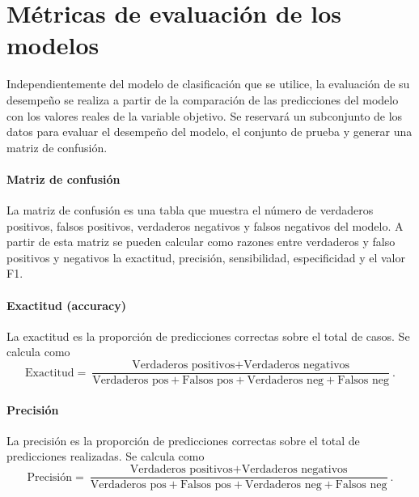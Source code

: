 \documentclass[a4paper]{report}
\begin{document}



\section{Métricas de evaluación de los modelos}

Independientemente del modelo de clasificación que se utilice, la evaluación de su desempeño se realiza a partir de la comparación de las predicciones del modelo con los valores reales de la variable objetivo.
Se reservará un subconjunto de los datos para evaluar el desempeño del modelo, el conjunto de prueba y generar una matriz de confusión.

\paragraph{Matriz de confusión}
La matriz de confusión es una tabla que muestra el número de verdaderos positivos, falsos positivos, verdaderos negativos y falsos negativos del modelo.
A partir de esta matriz se pueden calcular como razones entre verdaderos y falso positivos y negativos la exactitud, precisión, sensibilidad, especificidad y el valor F1.

\paragraph{Exactitud (accuracy)}
La exactitud es la proporción de predicciones correctas sobre el total de casos.
Se calcula como
\begin{equation}
	\text{Exactitud} = \frac{\text{Verdaderos positivos} + \text{Verdaderos negativos}}{\text{Verdaderos pos} + \text{Falsos pos} + \text{Verdaderos neg} + \text{Falsos neg}}.
\end{equation}

\paragraph{Precisión}
La precisión es la proporción de predicciones correctas sobre el total de predicciones realizadas.
Se calcula como
\begin{equation}
	\text{Precisión} = \frac{\text{Verdaderos positivos} + \text{Verdaderos negativos}}{\text{Verdaderos pos} + \text{Falsos pos} + \text{Verdaderos neg} + \text{Falsos neg}}.
\end{equation}
\end{document}
